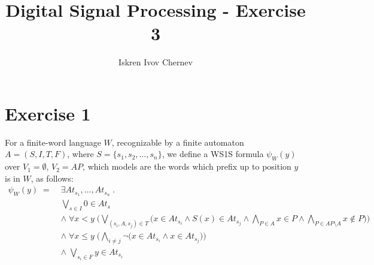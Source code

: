 \documentclass[a4paper]{article}
\begin{document}
\title{Digital Signal Processing - Exercise 3}
\author{Iskren Ivov Chernev}
\maketitle


\section*{Exercise 1}

For a finite-word language $W$, recognizable by a finite automaton $A=(S,I,T,F)$, where $S = \{s_1,s_2,\ldots,s_n\}$, we define a WS1S formula $\psi_W(y)$ over $V_1 = \emptyset$, $V_2 = AP$, which models are the words which prefix up to position $y$ is in $W$, as follows:
\begin{align*}
\psi_W(y) \; = \; & \exists At_{s_1},\ldots,At_{s_n} \;.\\
& \bigvee\limits_{s\in I} 0 \in At_s \\
& \land \; \forall x<y \; \Bigg(
\bigvee\limits_{(s_i,A,s_j)\in T} \Big( x \in At_{s_i} \land S(x) \in At_{s_j}
\land \bigwedge\limits_{P \in A} x \in P
\land \bigwedge\limits_{P \in AP \setminus A} x \not\in P \Big) \Bigg) \\
& \land \; \forall x \leq y \; \Bigg(
\bigwedge\limits_{i \neq j} \neg \Big( x \in At_{s_i} \land x \in At_{s_j} \Big) \Bigg) \\
& \land \; \bigvee\limits_{s_i \in F} y \in At_{s_i}
\end{align*}
\end{document}
